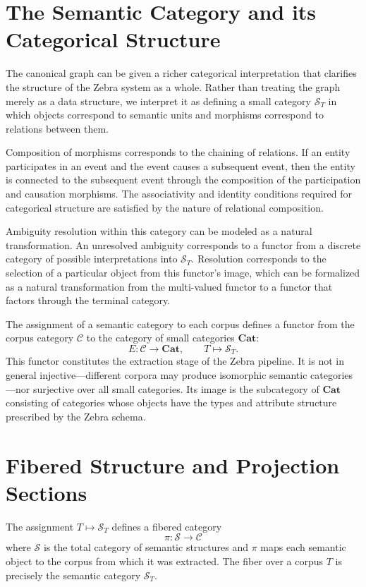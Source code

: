 \documentclass[12pt,a4paper]{article}
\begin{document}
\section{The Semantic Category and its Categorical Structure}

The canonical graph can be given a richer categorical interpretation that clarifies the structure of the Zebra system as a whole. Rather than treating the graph merely as a data structure, we interpret it as defining a small category $\mathcal{S}_T$ in which objects correspond to semantic units and morphisms correspond to relations between them.

Composition of morphisms corresponds to the chaining of relations. If an entity participates in an event and the event causes a subsequent event, then the entity is connected to the subsequent event through the composition of the participation and causation morphisms. The associativity and identity conditions required for categorical structure are satisfied by the nature of relational composition.

Ambiguity resolution within this category can be modeled as a natural transformation. An unresolved ambiguity corresponds to a functor from a discrete category of possible interpretations into $\mathcal{S}_T$. Resolution corresponds to the selection of a particular object from this functor's image, which can be formalized as a natural transformation from the multi-valued functor to a functor that factors through the terminal category.

The assignment of a semantic category to each corpus defines a functor from the corpus category $\mathcal{C}$ to the category of small categories $\mathbf{Cat}$:
\[
E : \mathcal{C} \rightarrow \mathbf{Cat}, \qquad T \mapsto \mathcal{S}_T.
\]
This functor constitutes the extraction stage of the Zebra pipeline. It is not in general injective—different corpora may produce isomorphic semantic categories—nor surjective over all small categories. Its image is the subcategory of $\mathbf{Cat}$ consisting of categories whose objects have the types and attribute structure prescribed by the Zebra schema.

\section{Fibered Structure and Projection Sections}

The assignment $T \mapsto \mathcal{S}_T$ defines a fibered category
\[
\pi : \mathcal{S} \rightarrow \mathcal{C}
\]
where $\mathcal{S}$ is the total category of semantic structures and $\pi$ maps each semantic object to the corpus from which it was extracted. The fiber over a corpus $T$ is precisely the semantic category $\mathcal{S}_T$.
\end{document}
